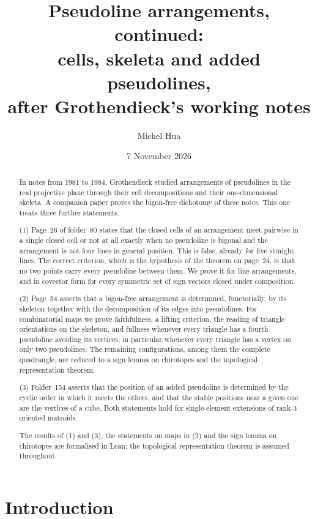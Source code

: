 \documentclass[11pt,a4paper]{amsart}
\title[Pseudoline arrangements, continued]{Pseudoline arrangements, continued:\\ cells, skeleta and added pseudolines,\\ after Grothendieck's working notes}
\author{Michel Hua}
\date{7 November 2026}
\theoremstyle{definition}
\theoremstyle{remark}
\begin{document}
\begin{abstract}
In notes from 1981 to 1984, Grothendieck studied arrangements of pseudolines in the real projective plane through their cell decompositions and their one-dimensional skeleta. A companion paper proves the bigon-free dichotomy of these notes. This one treats three further statements.

(1) Page~26 of folder~80 states that the closed cells of an arrangement meet pairwise in a single closed cell or not at all exactly when no pseudoline is bigonal and the arrangement is not four lines in general position. This is false, already for five straight lines. The correct criterion, which is the hypothesis of the theorem on page~24, is that no two points carry every pseudoline between them. We prove it for line arrangements, and in covector form for every symmetric set of sign vectors closed under composition.

(2) Page~54 asserts that a bigon-free arrangement is determined, functorially, by its skeleton together with the decomposition of its edges into pseudolines. For combinatorial maps we prove faithfulness, a lifting criterion, the reading of triangle orientations on the skeleton, and fullness whenever every triangle has a fourth pseudoline avoiding its vertices, in particular whenever every triangle has a vertex on only two pseudolines. The remaining configurations, among them the complete quadrangle, are reduced to a sign lemma on chirotopes and the topological representation theorem.

(3) Folder~154 asserts that the position of an added pseudoline is determined by the cyclic order in which it meets the others, and that the stable positions near a given one are the vertices of a cube. Both statements hold for single-element extensions of rank-$3$ oriented matroids.

The results of (1) and (3), the statements on maps in (2) and the sign lemma on chirotopes are formalised in Lean; the topological representation theorem is assumed throughout.
\end{abstract}

\maketitle

\section{Introduction}
\end{document}
